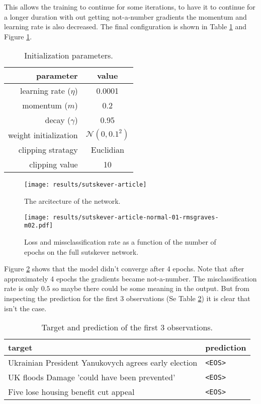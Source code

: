 This allows the training to continue for some iterations, to have it to continue for a longer duration with out getting not-a-number gradients the momentum and learning rate is also decreased. The final configuration is shown in Table \ref{fig:results:sutskever:article-parameters} and Figure \ref{fig:results:sutskever:article-artitecture}.
\begin{table}[h]
\centering
\begin{tabular}{r|c}
	parameter & value \\ \hline
	learning rate ($\eta$) & 0.0001 \\
	momentum ($m$) & 0.2 \\
	decay ($\gamma$) & 0.95 \\
	weight initialization & $\mathcal{N}(0, 0.1^2)$ \\
	clipping stratagy & Euclidian \\
	clipping value & 10
\end{tabular}
\caption{Initialization parameters.}
\label{fig:results:sutskever:article-parameters}
\end{table}

\begin{figure}[h]
	\centering
	\texttt{[image: results/sutskever-article]}
	\caption{The arcitecture of the network.}
	\label{fig:results:sutskever:article-artitecture}
\end{figure}

\begin{figure}[H]
	\centering
	\texttt{[image: results/sutskever-article-normal-01-rmsgraves-m02.pdf]}
	\caption{Loss and missclassification rate as a function of the number of epochs on the full sutskever network.}
	\label{fig:results:sutskever:article-learning}
\end{figure}

Figure \ref{fig:results:sutskever:article-learning} shows that the model didn't converge after 4 epochs. Note that after approximately 4 epochs the gradients became not-a-number. The misclassification rate is only $0.5$ so maybe there could be some meaning in the output. But from inspecting the prediction for the first 3 observations (Se Table \ref{fig:results:sutskever:predictions}) it is clear that isn't the case.
\begin{table}[h]
\centering
\begin{tabular}{p{9cm}|p{2cm}}
	target & prediction \\ \hline
	Ukrainian President Yanukovych agrees early election & \texttt{<EOS>} \\
	UK floods Damage 'could have been prevented' & \texttt{<EOS>} \\
	Five lose housing benefit cut appeal & \texttt{<EOS>}
\end{tabular}
\caption{Target and prediction of the first 3 observations.}
\label{fig:results:sutskever:predictions}
\end{table}

